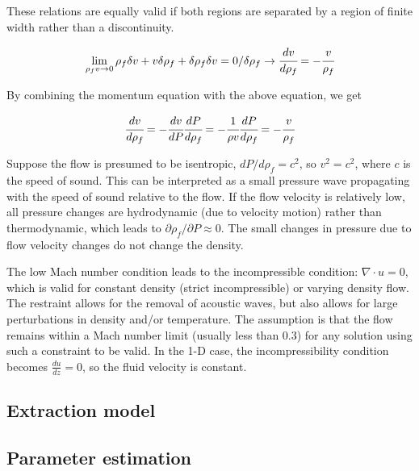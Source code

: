 \documentclass[a4paper,fleqn]{cas-dc}
\begin{document}
These relations are equally valid if both regions are separated by a region of finite width rather than a discontinuity. 

{\footnotesize
	\begin{equation*}
		\lim_{\rho_f v \rightarrow 0} \rho_f \delta v + v \delta \rho_f + \delta \rho_f \delta v = 0 / \delta \rho_f \rightarrow \cfrac{d v}{d \rho_f} = - \cfrac{v}{\rho_f}
	\end{equation*}
}

By combining the momentum equation with the above equation, we get

{\footnotesize
	\begin{equation} \label{EQ: Pressure_Velocity}
		\cfrac{d v}{d \rho_f} = - \cfrac{d v}{dP} \cfrac{d P}{d \rho_f} = -\cfrac{1}{\rho v} \cfrac{dP}{d\rho_f} = -\cfrac{v}{\rho_f}
	\end{equation}
}

Suppose the flow is presumed to be isentropic, $dP/d\rho_f = c^2$, so $v^2=c^2$, where $c$ is the speed of sound. This can be interpreted as a small pressure wave propagating with the speed of sound relative to the flow. If the flow velocity is relatively low, all pressure changes are hydrodynamic (due to velocity motion) rather than thermodynamic, which leads to $\partial \rho_f / \partial P \approx 0$. The small changes in pressure due to flow velocity changes do not change the density. 

The low Mach number condition leads to the incompressible condition: $\nabla \cdot u =0$, which is valid for constant density (strict incompressible) or varying density flow. The restraint allows for the removal of acoustic waves, but also allows for large perturbations in density and/or temperature. The assumption is that the flow remains within a Mach number limit (usually less than 0.3) for any solution using such a constraint to be valid. In the 1-D case, the incompressibility condition becomes $\frac{du}{dz} = 0$, so the fluid velocity is constant.

\subsection{Extraction model} \label{CH: Extraction_model}


\subsection{Parameter estimation} \label{CH: Parameter_estimation}

\end{document}
